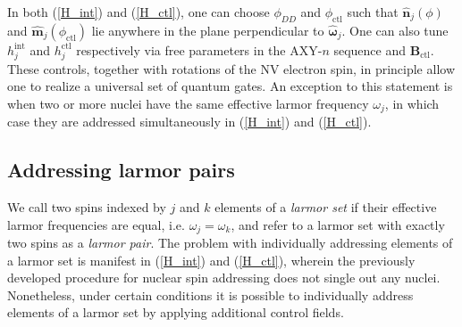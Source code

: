 \documentclass[twocolumn]{revtex4}
\renewcommand{\t}{\text} %
\newcommand{\p}[1]{\left(#1\right)} %
\renewcommand{\v}{\bm} %
\newcommand{\uv}[1]{\hat{\v{#1}}} %
\begin{document}
In both (\ref{H_int}) and (\ref{H_ctl}), one can choose $\phi_{DD}$
and $\phi_\t{ctl}$ such that $\uv n_j\p\phi$ and
$\uv m_j\p{\phi_\t{ctl}}$ lie anywhere in the plane perpendicular to
$\uv\omega_j$. One can also tune $h_j^\t{int}$ and $h_j^\t{ctl}$
respectively via free parameters in the AXY-$n$ sequence and
$\v B_\t{ctl}$. These controls, together with rotations of the NV
electron spin, in principle allow one to realize a universal set of
quantum gates. An exception to this statement is when two or more
nuclei have the same effective larmor frequency $\omega_j$, in which
case they are addressed simultaneously in (\ref{H_int}) and
(\ref{H_ctl}).

\subsection{Addressing larmor pairs}

We call two spins indexed by $j$ and $k$ elements of a \emph{larmor
  set} if their effective larmor frequencies are equal,
i.e. $\omega_j=\omega_k$, and refer to a larmor set with exactly two
spins as a \emph{larmor pair}. The problem with individually
addressing elements of a larmor set is manifest in (\ref{H_int}) and
(\ref{H_ctl}), wherein the previously developed procedure for nuclear
spin addressing does not single out any nuclei. Nonetheless, under
certain conditions it is possible to individually address elements of
a larmor set by applying additional control fields.
\end{document}
